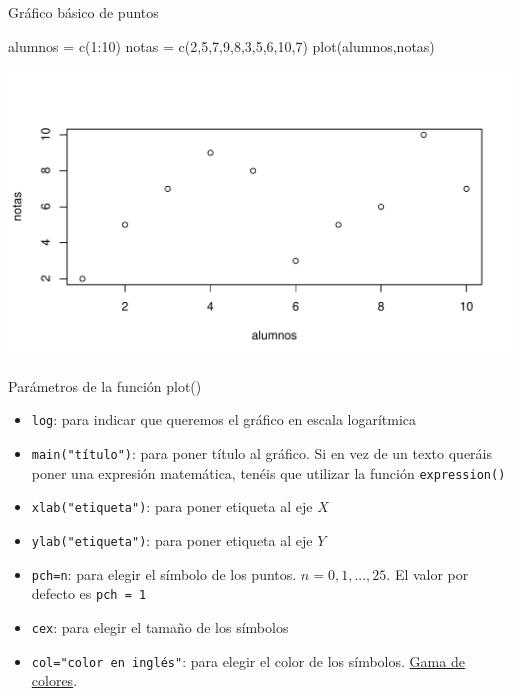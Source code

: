 \documentclass[
  ignorenonframetext,
  aspectratio=169]{beamer}
\newenvironment{Shaded}{\begin{snugshade}}{\end{snugshade}}
\newcommand{\DecValTok}[1]{\textcolor[rgb]{0.00,0.00,0.81}{#1}}
\newcommand{\FunctionTok}[1]{\textcolor[rgb]{0.00,0.00,0.00}{#1}}
\newcommand{\NormalTok}[1]{#1}
\newcommand{\OtherTok}[1]{\textcolor[rgb]{0.56,0.35,0.01}{#1}}
\newcommand{\SpecialCharTok}[1]{\textcolor[rgb]{0.00,0.00,0.00}{#1}}
\providecommand{\tightlist}{%
  \setlength{\itemsep}{0pt}\setlength{\parskip}{0pt}}
\begin{document}
\begin{frame}[fragile]{Gráfico básico de puntos}
\protect\hypertarget{gruxe1fico-buxe1sico-de-puntos-1}{}
\begin{Shaded}
\begin{Highlighting}[]
\NormalTok{alumnos }\OtherTok{=} \FunctionTok{c}\NormalTok{(}\DecValTok{1}\SpecialCharTok{:}\DecValTok{10}\NormalTok{)}
\NormalTok{notas }\OtherTok{=} \FunctionTok{c}\NormalTok{(}\DecValTok{2}\NormalTok{,}\DecValTok{5}\NormalTok{,}\DecValTok{7}\NormalTok{,}\DecValTok{9}\NormalTok{,}\DecValTok{8}\NormalTok{,}\DecValTok{3}\NormalTok{,}\DecValTok{5}\NormalTok{,}\DecValTok{6}\NormalTok{,}\DecValTok{10}\NormalTok{,}\DecValTok{7}\NormalTok{)}
\FunctionTok{plot}\NormalTok{(alumnos,notas)}
\end{Highlighting}
\end{Shaded}

\begin{center}\includegraphics[width=0.75\linewidth]{Hora2_files/figure-beamer/unnamed-chunk-9-1} \end{center}
\end{frame}

\begin{frame}[fragile]{Parámetros de la función plot()}
\protect\hypertarget{paruxe1metros-de-la-funciuxf3n-plot}{}
\begin{itemize}
\tightlist
\item
  \texttt{log}: para indicar que queremos el gráfico en escala
  logarítmica
\item
  \texttt{main("título")}: para poner título al gráfico. Si en vez de un
  texto queráis poner una expresión matemática, tenéis que utilizar la
  función \texttt{expression()}
\item
  \texttt{xlab("etiqueta")}: para poner etiqueta al eje \(X\)
\item
  \texttt{ylab("etiqueta")}: para poner etiqueta al eje \(Y\)
\item
  \texttt{pch=n}: para elegir el símbolo de los puntos.
  \(n=0,1,...,25\). El valor por defecto es \texttt{pch\ =\ 1}
\item
  \texttt{cex}: para elegir el tamaño de los símbolos
\item
  \texttt{col="color\ en\ inglés"}: para elegir el color de los
  símbolos.
  \href{http://www.stat.columbia.edu/~tzheng/files/Rcolor.pdf}{Gama de
  colores}.
\end{itemize}
\end{frame}
\end{document}
